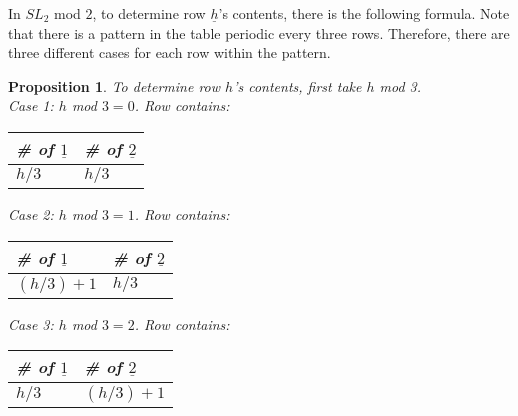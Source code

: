 \documentclass[a4paper,draft]{amsproc}
\theoremstyle{plain}
\newtheorem{prop}{Proposition}[section]
\theoremstyle{definition}
\theoremstyle{remark}
\numberwithin{equation}{section}
\begin{document}
In $SL_{2}$ mod $2$, to determine row $\underline{h}$'s contents, there is the following formula. Note that there is a pattern in the table periodic every three rows. Therefore, there are three different cases for each row within the pattern.
\begin{prop}
To determine row $h$'s contents, first take $h$ mod 3. \\
Case 1: $h$ mod $3 = 0$. Row contains: 
\begin{table}[h]
\centering
    \begin{tabular}{|l|l|}
    \hline
    \# of $\underline{1}$ & \# of $\underline{2}$ \\ \hline
    $h/3$     & $h/3$     \\ \hline
    \end{tabular}
\end{table}

Case 2: $h$ mod $3 = 1$. Row contains: 
\begin{table}[h]
\centering
    \begin{tabular}{|l|l|}
    \hline
    \# of $\underline{1}$ & \# of $\underline{2}$ \\ \hline
    $(h/3) + 1$     & $h/3$     \\ \hline
    \end{tabular}
\end{table}

Case 3: $h$ mod $3 = 2$. Row contains: 
\begin{table}[h]
\centering
    \begin{tabular}{|l|l|}
    \hline
    \# of $\underline{1}$ & \# of $\underline{2}$ \\ \hline
    $h/3$     & $(h/3) + 1$     \\ \hline
    \end{tabular}
\end{table}

\end{prop}
\end{document}
